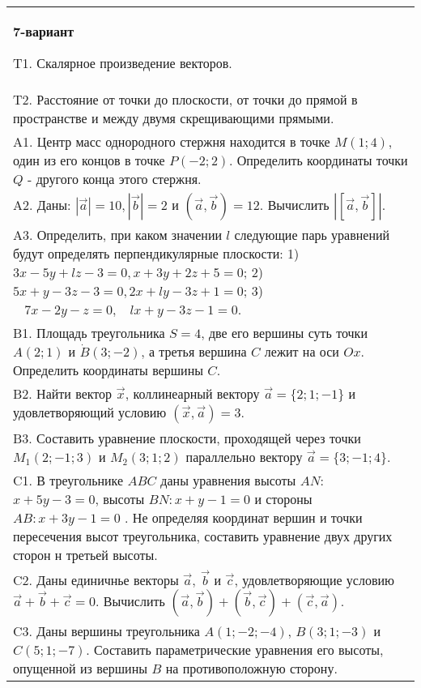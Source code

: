 \documentclass{article}
\begin{document}
\begin{tabular}{m{17cm}}
\textbf{7-вариант}
\newline

T1. 
Скалярное произведение векторов.
 \\
T2. 
Расстояние от точки до плоскости, от точки до прямой в пространстве и между двумя скрещивающими прямыми. \\
A1. 
Центр масс однородного стержня находится в точке \(M(1;4)\), один из его концов в точке \(P( - 2;2)\). Определить координаты точки \(Q\) - другого конца этого стержня.
 \\
A2. 
Даны: \(|\overrightarrow{a}| = 10,|\overrightarrow{b}| = 2\) и \(\left( \overrightarrow{a},\overrightarrow{b} \right) = 12\). Вычислить \(\left| \left\lbrack \overrightarrow{a},\overrightarrow{b} \right\rbrack \right|\).
 \\
A3. 
Определить, при каком значении \(l\) следующие парь уравнений будут определять перпендикулярные плоскости: 1) \(3x - 5y + lz - 3 = 0,x + 3y + 2z + 5 = 0\); 2) \(5x + y - 3z - 3 = 0,2x + ly - 3z + 1 = 0\); 3) \(\ \ \ \ 7x - 2y - z = 0,\ \ \ \ lx + y - 3z - 1 = 0\).
 \\
B1. 
Площадь треугольника \(S = 4\), две его вершины суть точки \(A(2;1)\) и \(\dot{B}(3; - 2)\), а третья вершина \(C\) лежит на оси \(Ox\). Определить координаты вершины \(C\).
 \\
B2. 
Найти вектор \(\overrightarrow{x}\), коллинеарный вектору \(\overrightarrow{a} = \{ 2;1; - 1\}\) и удовлетворяющий условию \(\left( \overrightarrow{x},\overrightarrow{a} \right) = 3\).
 \\
B3. 
Составить уравнение плоскости, проходящей через точки \(M_{1}(2; - 1;3)\) и \(M_{2}(3;1;2)\) параллельно вектору \(\overrightarrow{a} = \{ 3; - 1;4\}\).
 \\
C1. 
В треугольнике \(ABC\) даны уравнения высоты \(AN\): \(x + 5y - 3 = 0\), высоты \(BN:x + y - 1 = 0\) и стороны \(AB:x + 3y - 1 = 0\) . Не определяя координат вершин и точки пересечения высот треугольника, составить уравнение двух других сторон н третьей высоты.
 \\
C2. 
Даны единичнье векторы \(\overrightarrow{a},\ \overrightarrow{b}\) и \(\overrightarrow{c}\), удовлетворяющие условию \(\overrightarrow{a} + \overrightarrow{b} + \overrightarrow{c} = 0\). Вычислить \(\left( \overrightarrow{a},\overrightarrow{b} \right) + \left( \overrightarrow{b},\overrightarrow{c} \right) + \left( \overrightarrow{c},\overrightarrow{a} \right)\).
 \\
C3. 
Даны вершины треугольника \(A(1; - 2; - 4)\), \(B(3;1; - 3)\) и \(C(5;1; - 7)\). Составить параметрические уравнения его высоты, опущенной из вершины \(B\) на противоположную сторону.
 \\

\end{tabular}
\vspace{1cm}
\end{document}
